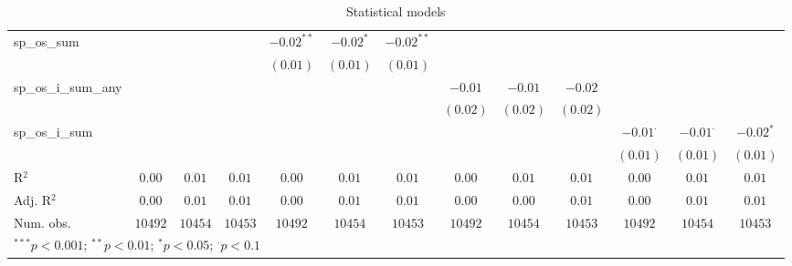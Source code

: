 \begin{sidewaystable}
\begin{center}
{\begin{tabular}{l c c c c c c c c c c c c}
sp\_os\_sum         &               &                 &                 & $-0.02^{**}$  & $-0.02^{*}$     & $-0.02^{**}$    &                 &                 &                 &                 &                 &                 \\
                    &               &                 &                 & $(0.01)$      & $(0.01)$        & $(0.01)$        &                 &                 &                 &                 &                 &                 \\
sp\_os\_i\_sum\_any &               &                 &                 &               &                 &                 & $-0.01$         & $-0.01$         & $-0.02$         &                 &                 &                 \\
                    &               &                 &                 &               &                 &                 & $(0.02)$        & $(0.02)$        & $(0.02)$        &                 &                 &                 \\
sp\_os\_i\_sum      &               &                 &                 &               &                 &                 &                 &                 &                 & $-0.01^{\cdot}$ & $-0.01^{\cdot}$ & $-0.02^{*}$     \\
                    &               &                 &                 &               &                 &                 &                 &                 &                 & $(0.01)$        & $(0.01)$        & $(0.01)$        \\
\hline
R$^2$               & $0.00$        & $0.01$          & $0.01$          & $0.00$        & $0.01$          & $0.01$          & $0.00$          & $0.01$          & $0.01$          & $0.00$          & $0.01$          & $0.01$          \\
Adj. R$^2$          & $0.00$        & $0.01$          & $0.01$          & $0.00$        & $0.01$          & $0.01$          & $0.00$          & $0.00$          & $0.01$          & $0.00$          & $0.01$          & $0.01$          \\
Num. obs.           & $10492$       & $10454$         & $10453$         & $10492$       & $10454$         & $10453$         & $10492$         & $10454$         & $10453$         & $10492$         & $10454$         & $10453$         \\
\hline
\multicolumn{13}{l}{\scriptsize{$^{***}p<0.001$; $^{**}p<0.01$; $^{*}p<0.05$; $^{\cdot}p<0.1$}}
\end{tabular}
}
\caption{Statistical models}
\label{table:coefficients}
\end{center}
\end{sidewaystable}
